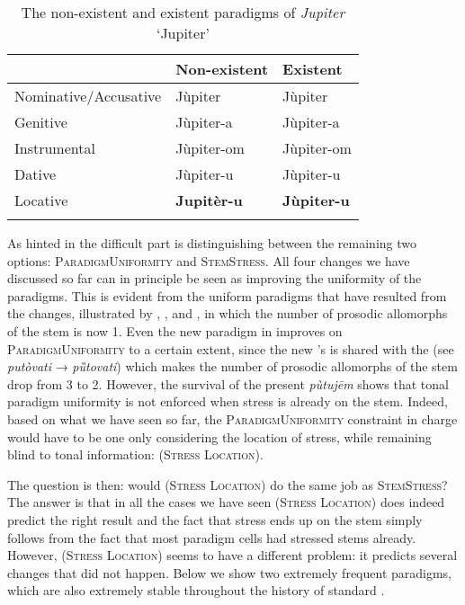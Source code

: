 \documentclass[output=paper,nonflat,colorlinks,citecolor=brown,newtxmath]{langsci/langscibook}
\begin{document}
\begin{table}
\caption{The non-existent and existent paradigms of \textit{Jupiter} `Jupiter'}
\label{tab:kager:7}
\begin{tabular}{  l l l }
  \lsptoprule
& Non-existent  & Existent\\
 \midrule
Nominative/Accusative  &  Jùpiter  &   Jùpiter\\
Genitive  &  Jùpiter-a  & Jùpiter-a\\
Instrumental  &  Jùpiter-om & Jùpiter-om\\
Dative  & Jùpiter-u & Jùpiter-u\\
Locative  & \textbf{Jupitèr-u} & \textbf{Jùpiter-u}\\
  \lspbottomrule
 \end{tabular}
\end{table}

\newpage
As hinted in  the difficult part is distinguishing between the remaining two options: \textsc{ParadigmUniformity} and \textsc{StemStress}. All four changes we have discussed so far can in principle be seen as improving the uniformity of the paradigms. This is evident from the uniform paradigms that have resulted from the changes, illustrated by , , and , in which the number of prosodic allomorphs of the stem is now 1. Even the new paradigm in   improves on \textsc{ParadigmUniformity} to a certain extent, since the new 's  is shared with the  (see \textit{putòvati} → \textit{pȕtovati}) which makes the number of prosodic allomorphs of the stem drop from 3 to 2. However, the survival of the present  \textit{pùtujēm} shows that tonal paradigm uniformity is not enforced when stress is already on the stem. Indeed, based on what we have seen so far, the \textsc{ParadigmUniformity} constraint in charge would have to be one only considering the location of stress, while remaining blind to tonal information: \textsc{(Stress Location)}.

The question is then: would \textsc{(Stress Location)} do the same job as \textsc{StemStress}? The answer is that in all the cases we have seen \textsc{(Stress Location)} does indeed predict the right result and the fact that stress ends up on the stem simply follows from the fact that most paradigm cells had stressed stems already. However, \textsc{(Stress Location)} seems to have a different problem: it predicts several changes that did not happen. Below we show two extremely frequent paradigms, which are also extremely stable throughout the history of standard .
\end{document}
